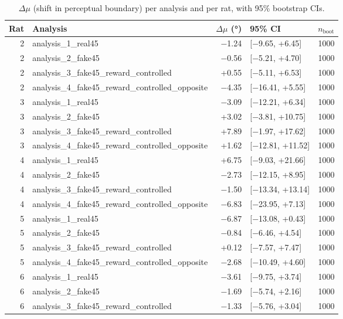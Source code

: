 \begin{table}[htbp]
  \centering
  \caption{$\Delta\mu$ (shift in perceptual boundary) per analysis and per rat, with 95\% bootstrap CIs.}
  \label{tab:choice_delta_mu}
  \begin{tabular}{rlrlr}
    \toprule
    Rat & Analysis & $\Delta\mu$ (°) & 95\% CI & $n_{\mathrm{boot}}$ \\
    \midrule
    2 & analysis\_1\_real45 & −1.24 & [−9.65, +6.45] & 1000 \\
    2 & analysis\_2\_fake45 & −0.56 & [−5.21, +4.70] & 1000 \\
    2 & analysis\_3\_fake45\_reward\_controlled & +0.55 & [−5.11, +6.53] & 1000 \\
    2 & analysis\_4\_fake45\_reward\_controlled\_opposite & −4.35 & [−16.41, +5.55] & 1000 \\
    3 & analysis\_1\_real45 & −3.09 & [−12.21, +6.34] & 1000 \\
    3 & analysis\_2\_fake45 & +3.02 & [−3.81, +10.75] & 1000 \\
    3 & analysis\_3\_fake45\_reward\_controlled & +7.89 & [−1.97, +17.62] & 1000 \\
    3 & analysis\_4\_fake45\_reward\_controlled\_opposite & +1.62 & [−12.81, +11.52] & 1000 \\
    4 & analysis\_1\_real45 & +6.75 & [−9.03, +21.66] & 1000 \\
    4 & analysis\_2\_fake45 & −2.73 & [−12.15, +8.95] & 1000 \\
    4 & analysis\_3\_fake45\_reward\_controlled & −1.50 & [−13.34, +13.14] & 1000 \\
    4 & analysis\_4\_fake45\_reward\_controlled\_opposite & −6.83 & [−23.95, +7.13] & 1000 \\
    5 & analysis\_1\_real45 & −6.87 & [−13.08, +0.43] & 1000 \\
    5 & analysis\_2\_fake45 & −0.84 & [−6.46, +4.54] & 1000 \\
    5 & analysis\_3\_fake45\_reward\_controlled & +0.12 & [−7.57, +7.47] & 1000 \\
    5 & analysis\_4\_fake45\_reward\_controlled\_opposite & −2.68 & [−10.49, +4.60] & 1000 \\
    6 & analysis\_1\_real45 & −3.61 & [−9.75, +3.74] & 1000 \\
    6 & analysis\_2\_fake45 & −1.69 & [−5.74, +2.16] & 1000 \\
    6 & analysis\_3\_fake45\_reward\_controlled & −1.33 & [−5.76, +3.04] & 1000 \\

\end{tabular}
\end{table}
